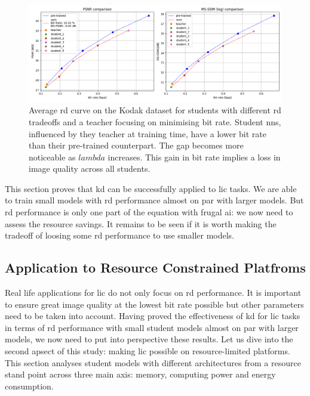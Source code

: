 \begin{figure}
    \centering
    \includegraphics[width=15cm]{../img/kd_lic_rd_lambda_2.png}
    \caption[Average \acrshort{rd} curve on the Kodak dataset for students with different \acrshort{rd} tradeoffs and a teacher focusing on minimising bit rate.]{Average \acrshort{rd} curve on the Kodak dataset for students with different \acrshort{rd} tradeoffs and a teacher focusing on minimising bit rate. Student \acrshort{nn}s, influenced by they teacher at training time, have a lower bit rate than their pre-trained counterpart. The gap becomes more noticeable as \(lambda\) increases. This gain in bit rate implies a loss in image quality across all students.}
    \label{kd_lic_4_bis}
\end{figure}

This section proves that \acrshort{kd} can be successfully applied to \acrshort{lic} tasks. We are able to train small models with \acrshort{rd} performance almost on par with larger models. But \acrshort{rd} performance is only one part of the equation with frugal \acrshort{ai}: we now need to assess the resource savings. It remains to be seen if it is worth making the tradeoff of loosing some \acrshort{rd} performance to use smaller models.

\subsection{Application to Resource Constrained Platfroms}
\label{application_resource_contrained_platforms}
Real life applications for \acrshort{lic} do not only focus on \acrshort{rd} performance. It is important to ensure great image quality at the lowest bit rate possible but other parameters need to be taken into account. Having proved the effectiveness of \acrshort{kd} for \acrshort{lic} tasks in terms of \acrshort{rd} performance with small student models almost on par with larger models, we now need to put into perspective these results. Let us dive into the second apsect of this study: making \acrshort{lic} possible on resource-limited platforms. This section analyses student models with different architectures from a resource stand point across three main axis: memory, computing power and energy consumption.

